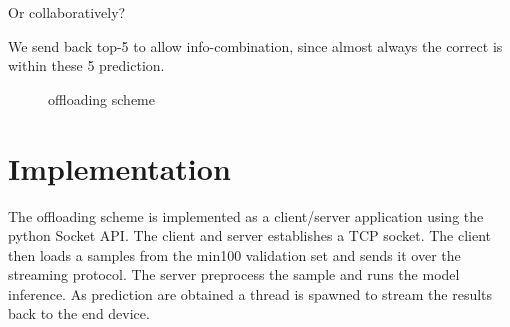 Or collaboratively?

We send back top-5 to allow info-combination, since almost always the correct is within these 5 prediction. 

\begin{figure}
	\captionsetup[subfigure]{justification=centering}
	\hfill
	\caption[Offloading scheme]{offloading scheme}
	\label{fig:offloading-scheme}
\end{figure} 

\section{Implementation}

The offloading scheme is implemented as a client/server application using the \gls{python} Socket API. The client and server establishes a TCP socket. The client then loads a samples from the \gls{min100} validation set and sends it over the streaming protocol. The server preprocess the sample and runs the model inference. As prediction are obtained a thread is spawned to stream the results back to the end device. 

